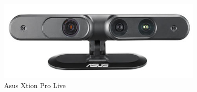 \begin{figure}
	[h] \centering 
	\includegraphics[height=4cm]{figures/content/xtion.png} \caption{Asus Xtion Pro Live} \label{fg:xtion} 
\end{figure}
